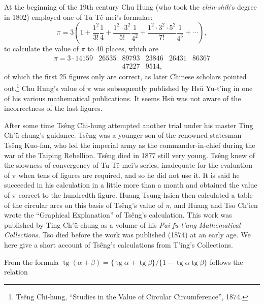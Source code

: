 \documentclass[11pt]{article}
\newcommand{\scanfooter}{}
\newcommand{\tg}{\mathop{\mathrm{tg}}}
\begin{document}
At the beginning of the 19th century Chu Hung (who took the \emph{chin-shih}'s degree in 1802) employed one of Tu Tê-mei's formulae:
\[
\pi=3\left(1+\frac{1^2}{3!}\frac{1}{4}+\frac{1^2\cdot3^2}{5!}\frac{1}{4^2}+\frac{1^2\cdot3^2\cdot5^2}{7!}\frac{1}{4^3}+\cdots\right),
\]
to calculate the value of $\pi$ to 40 places, which are
\[
\begin{array}{rrrrrr}
\pi=3\cdot14159&26535&89793&23846&26431&86367\\
&&47227&9514,
\end{array}
\]
of which the first 25 figures only are correct, as later Chinese scholars pointed out.\footnote{Tsêng Chi-hung, ``Studies in the Value of Circular Circumference'', 1874.} Chu Hung's value of $\pi$ was subsequently published by Hsü Yu-t'ing in one of his various mathematical publications. It seems Hsü was not aware of the incorrectness of the last figures.

After some time Tsêng Chi-hung attempted another trial under his master Ting Ch'ü-chung's guidance. Tsêng was a younger son of the renowned statesman Tsêng Kuo-fan, who led the imperial army as the commander-in-chief during the war of the Taiping Rebellion. Tsêng died in 1877 still very young. Tsêng knew of the slowness of convergency of Tu Tê-mei's series, inadequate for the evaluation of $\pi$ when tens of figures are required, and so he did not use it. It is said he succeeded in his calculation in a little more than a month and obtained the value of $\pi$ correct to the hundredth figure. Huang Tsung-hsien then calculated a table of the circular arcs on this basis of Tsêng's value of $\pi$, and Huang and Tso Ch'ien wrote the ``Graphical Explanation'' of Tsêng's calculation. This work was published by Ting Ch'ü-chung as a volume of his \emph{Pai-fu-t'ang Mathematical Collections}. Tso died before the work was published (1874) at an early age. We here give a short account of Tsêng's calculations from T'ing's Collections.

From the formula $\tg(\alpha+\beta)=\{\tg\alpha+\tg\beta\}/\{1-\tg\alpha\tg\beta\}$ follows the relation
\scanfooter
\end{document}

